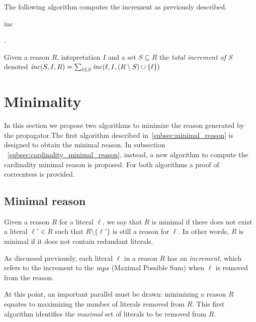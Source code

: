 The following algorithm computes the increment as previously described.
\begin{algorithm}[h]\small
    \caption{inc}
        \label{alg:increment}
        .
\end{algorithm}

Given a reason $R$, intepretation $I$ and a set $S \subseteq R$
the \textit{total increment of S} denoted $\mathit{inc}(S,I,R) = \sum_{\ell \in S} \mathit{inc}(\ell, I, (R \setminus S)\cup \{\ell\})$ 

\section{Minimality}
\label{sec:minimality}
In this section we  propose two algorithms to minimize the reason 
generated by the propagator.The first algorithm described in~\eqref{subsec:minimal_reason} 
is designed to obtain the minimal reason.
In subsection ~\ref{subsec:cardinality_minimal_reason}, instead,
a new algorithm to compute the cardinality minimal reason is proposed.
For both algorithms a proof of correcntess is provided.

\subsection{Minimal reason}
\label{subsec:minimal_reason}

Given a reason $R$ for a literal $\ell$, we say that $R$ is minimal if there does not exist a literal $\ell' \in R$ such that $R \setminus \{\ell'\}$ is still a reason for $\ell$. In other words, $R$ is minimal if it does not contain redundant literals. 

As discussed previously, each literal $\ell$ in a reason $R$ has an \textit{increment}, which refers to the increment to the $\mathit{mps}$ (Maximal Possible Sum) when $\ell$ is removed from the reason.

At this point, an important parallel must be drawn: 
minimizing a reason \(R\) equates to maximizing the
number of literals removed from \(R\). 
This first algorithm identifies the \textit{maximal} 
set of literals to be removed from \(R\).


